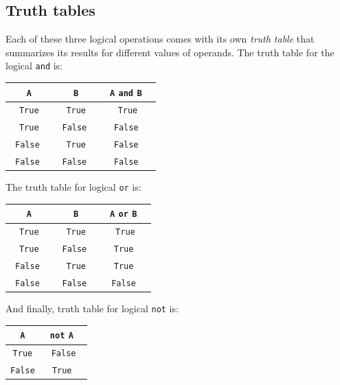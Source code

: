 \subsection[\ \ Truth tables]{Truth tables}

Each of these three logical operations comes with its own {\em truth table} that 
summarizes its results for different values of operands. The truth table for the 
logical {\tt and} is:\\

\begin{center}
\begin{tabular}{|c|c||c|}
\hline
{\tt A} & {\tt B} & \ {\tt A} {\tt and} {\tt B} \ \\
\hline
\hline
{\tt True} & {\tt True} & {\tt True} \\
\hline
{\tt True} & \ {\tt False} \ & \ {\tt False} \ \\
\hline
\ {\tt False} \ & {\tt True} & \ {\tt False} \ \\
\hline
\ {\tt False} \ & \ {\tt False} \ & \ {\tt False} \ \\
\hline
\end{tabular}
\end{center}
\vspace{4mm}
\noindent
The truth table for logical {\tt or} is:\\

\begin{center}
\begin{tabular}{|c|c||c|}
\hline
{\tt A} & {\tt B} & \ {\tt A} {\tt or} {\tt B} \ \\
\hline
\hline
{\tt True} & {\tt True} & {\tt True} \\
\hline
{\tt True} & \ {\tt False} \ & \ {\tt True} \ \\
\hline
\ {\tt False} \ & {\tt True} & \ {\tt True} \ \\
\hline
\ {\tt False} \ & \ {\tt False} \ & \ {\tt False} \ \\
\hline
\end{tabular}
\end{center}
\vspace{4mm}
\noindent
And finally, truth table for logical {\tt not} is:\\

\begin{center}
\begin{tabular}{|c||c|}
\hline
{\tt A} & \ {\tt not} {\tt A} \ \\
\hline
\hline
{\tt True} & {\tt False} \\
\hline
{\tt False} & \ {\tt True} \ \\
\hline
\end{tabular}
\end{center}
\vspace{4mm}
\noindent

